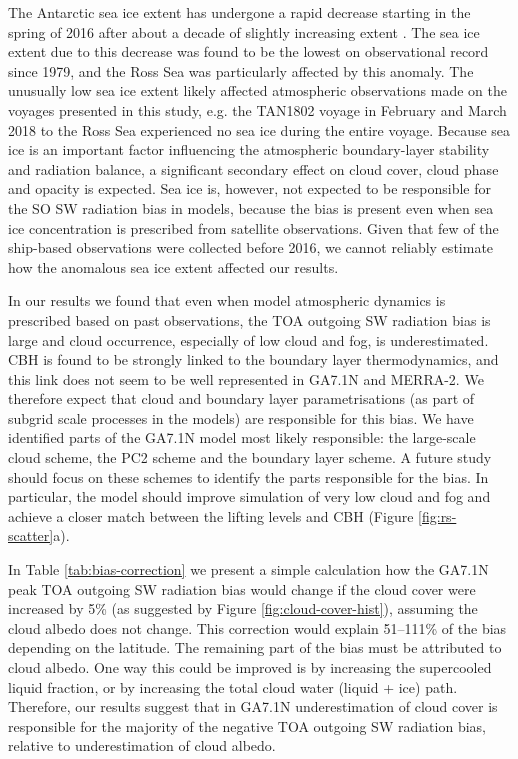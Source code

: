 The Antarctic sea ice extent has undergone a rapid decrease starting in the
spring of 2016 after about a decade of slightly increasing extent
\citep{turner2017,stuecker2017,doddridge2017,kusahara2018,schlosser2018,ludescher2018}.
The sea ice extent due to this decrease was found to be the lowest on
observational record since 1979, and the Ross Sea was particularly affected by
this anomaly. The unusually low sea ice extent likely affected atmospheric
observations made on the voyages presented in this study, e.g. the TAN1802
voyage in February and March 2018 to the Ross Sea experienced no sea ice during
the entire voyage. Because sea ice is an important factor influencing the
atmospheric boundary-layer stability and radiation balance, a significant
secondary effect on cloud cover, cloud phase and opacity is expected. Sea ice
is, however, not expected to be responsible for the SO SW radiation bias in
models, because the bias is present even when sea ice concentration is
prescribed from satellite observations. Given that few of the ship-based
observations were collected before 2016, we cannot reliably estimate how
the anomalous sea ice extent affected our results. 

In our results we found that even when model atmospheric dynamics is prescribed
based on past observations, the TOA outgoing SW radiation bias is large and
cloud occurrence, especially of low cloud and fog, is underestimated. CBH is
found to be strongly linked to the boundary layer thermodynamics, and this link
does not seem to be well represented in GA7.1N and MERRA-2. We therefore expect
that cloud and boundary layer parametrisations (as part of subgrid scale
processes in the models) are responsible for this bias. We have identified
parts of the GA7.1N model most likely responsible: the large-scale cloud scheme,
the PC2 scheme \citep{wilson2008a,wilson2008b} and the boundary layer scheme. A
future study should focus on these schemes to identify the parts responsible
for the bias. In particular, the model should improve simulation of very low
cloud and fog and achieve a closer match between the lifting levels and CBH
(Figure \ref{fig:rs-scatter}a).

In Table \ref{tab:bias-correction} we present a simple calculation how the
GA7.1N peak TOA outgoing SW radiation bias would change if the cloud cover were
increased by 5\% (as suggested by Figure \ref{fig:cloud-cover-hist}), assuming
the cloud albedo does not change. This correction would explain 51--111\% of
the bias depending on the latitude. The remaining part of the bias must be
attributed to cloud albedo. One way this could be improved is by increasing the
supercooled liquid fraction, or by increasing the total cloud water (liquid +
ice) path. Therefore, our results suggest that in GA7.1N underestimation of
cloud cover is responsible for the majority of the negative TOA outgoing SW
radiation bias, relative to underestimation of cloud albedo.

